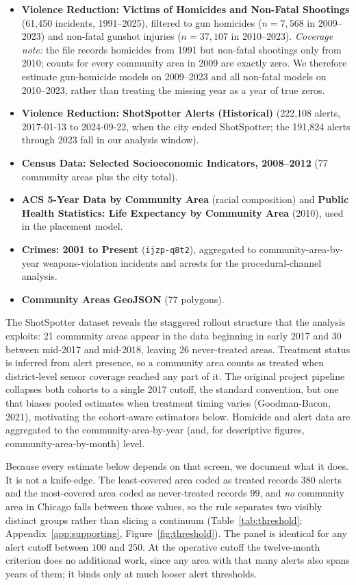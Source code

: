 \documentclass[12pt]{article}
\begin{document}
\begin{itemize}
\itemsep0.1em
\item \textbf{Violence Reduction: Victims of Homicides and Non-Fatal Shootings}
(61,450 incidents, 1991--2025), filtered to gun homicides ($n = 7{,}568$ in
2009--2023) and non-fatal gunshot injuries ($n = 37{,}107$ in 2010--2023).
\emph{Coverage note:} the file records homicides from 1991 but non-fatal shootings only
from 2010; counts for every community area in 2009 are exactly zero. We therefore estimate
gun-homicide models on 2009--2023 and all non-fatal models on 2010--2023, rather than
treating the missing year as a year of true zeros.
\item \textbf{Violence Reduction: ShotSpotter Alerts (Historical)} (222,108 alerts,
2017-01-13 to 2024-09-22, when the city ended ShotSpotter; the 191,824 alerts through 2023
fall in our analysis window).
\item \textbf{Census Data: Selected Socioeconomic Indicators, 2008--2012} (77 community
areas plus the city total).
\item \textbf{ACS 5-Year Data by Community Area} (racial composition) and \textbf{Public
Health Statistics: Life Expectancy by Community Area} (2010), used in the placement model.
\item \textbf{Crimes: 2001 to Present} (\texttt{ijzp-q8t2}), aggregated to
community-area-by-year weapons-violation incidents and arrests for the procedural-channel
analysis.
\item \textbf{Community Areas GeoJSON} (77 polygons).
\end{itemize}

The ShotSpotter dataset reveals the staggered rollout structure that the analysis
exploits: 21 community areas appear in the data beginning in early 2017 and 30 between
mid-2017 and mid-2018, leaving 26 never-treated areas. Treatment status is inferred from
alert presence, so a community area counts as treated when district-level sensor coverage
reached any part of it. The original project pipeline
collapses both cohorts to a single 2017 cutoff, the standard convention, but one that
biases pooled estimates when treatment timing varies (Goodman-Bacon, 2021), motivating
the cohort-aware estimators below. Homicide and alert data are aggregated to the
community-area-by-year (and, for descriptive figures, community-area-by-month) level.

Because every estimate below depends on that screen, we document what it does. It is not a
knife-edge. The least-covered area coded as treated records $380$ alerts and the
most-covered area coded as never-treated records $99$, and \emph{no} community area in
Chicago falls between those values, so the rule separates two visibly distinct groups rather
than slicing a continuum (Table~\ref{tab:threshold}; Appendix~\ref{app:supporting},
Figure~\ref{fig:threshold}). The panel is identical for any alert
cutoff between $100$ and $250$. At the operative cutoff the twelve-month criterion does no
additional work, since any area with that many alerts also spans years of them; it binds
only at much looser alert thresholds.
\end{document}
